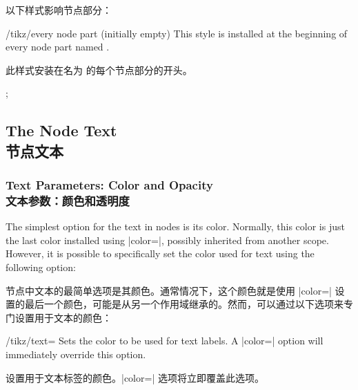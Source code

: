 \begin{command}{\nodepart{}}
    以下样式影响节点部分：

    \begin{stylekey}{/tikz/every  node part (initially \normalfont empty)}
        This style is installed at the beginning of every node part named
        .
        
        此样式安装在名为  的每个节点部分的开头。

\begin{codeexample}[preamble={\usetikzlibrary{shapes.multipart}}]
\tikz [every lower node part/.style={red}]
  ;
\end{codeexample}
    \end{stylekey}
\end{command}


\subsection{The Node Text\\节点文本}
\label{section-nodes-options}

\subsubsection{Text Parameters: Color and Opacity\\文本参数：颜色和透明度}

The simplest option for the text in nodes is its color. Normally, this color is
just the last color installed using |color=|, possibly inherited from another
scope. However, it is possible to specifically set the color used for text
using the following option:


节点中文本的最简单选项是其颜色。通常情况下，这个颜色就是使用 |color=| 设置的最后一个颜色，可能是从另一个作用域继承的。然而，可以通过以下选项来专门设置用于文本的颜色：

\begin{key}{/tikz/text=}
    Sets the color to be used for text labels. A |color=| option will
    immediately override this option.

    设置用于文本标签的颜色。|color=| 选项将立即覆盖此选项。

    \begin{codeexample}[]
\end{codeexample}
\end{key}

